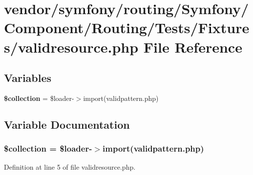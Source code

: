 \section{vendor/symfony/routing/\+Symfony/\+Component/\+Routing/\+Tests/\+Fixtures/validresource.php File Reference}
\label{validresource_8php}
\subsection*{Variables}
\begin{DoxyCompactItemize}
\item 
{\bf \$collection} = \$loader-\/$>$import(\textquotesingle{}validpattern.\+php\textquotesingle{})
\end{DoxyCompactItemize}


\subsection{Variable Documentation}
\subsubsection[{\$collection}]{ \$collection = \$loader-\/$>$import(\textquotesingle{}validpattern.\+php\textquotesingle{})}\label{validresource_8php_ab5ff1e0b2db362eeb5ee5f8ac51c3662}


Definition at line 5 of file validresource.\+php.

